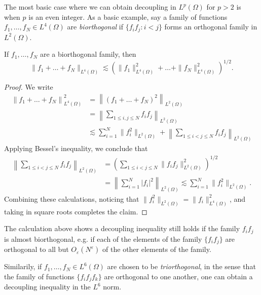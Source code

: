 The most basic case where we can obtain decoupling in $L^p(\Omega)$ for $p > 2$ is when $p$ is an even integer. As a basic example, say a family of functions $f_1, \dots, f_N \in L^4(\Omega)$ are \emph{biorthogonal} if $\{ f_i f_j : i < j \}$ forms an orthogonal family in $L^2(\Omega)$.

\begin{theorem}
  If $f_1, \dots, f_N$ are a biorthogonal family, then
  \[ \| f_1 + \dots + f_N \|_{L^4(\Omega)} \lesssim \left( \| f_1 \|_{L^4(\Omega)}^2 + \dots + \| f_N \|_{L^4(\Omega)}^2 \right)^{1/2}. \]
\end{theorem}
\begin{proof}
  We write
  \begin{align*}
    \left\| f_1 + \dots + f_N \right\|_{L^4(\Omega)}^2 &= \left\| (f_1 + \dots + f_N)^2 \right\|_{L^2(\Omega)}\\
    &= \left\| \sum_{1 \leq i,j \leq N} f_i f_j \right\|_{L^2(\Omega)}\\
    &\lesssim \sum_{i = 1}^N \| f_i^2 \|_{L^2(\Omega)} + \left\| \sum_{1 \leq i < j \leq N} f_i f_j \right\|_{L^2(\Omega)}
  \end{align*}
  Applying Bessel's inequality, we conclude that
  \begin{align*}
    \left\| \sum_{1 \leq i < j \leq N} f_i f_j \right\|_{L^2(\Omega)} &= \left( \sum_{1 \leq i < j \leq N} \| f_i f_j \|_{L^2(\Omega)}^2 \right)^{1/2}\\
    &= \left\| \sum_{i = 1}^N |f_i|^2 \right\|_{L^2(\Omega)} \lesssim \sum_{i = 1}^N \| f_i^2 \|_{L^2(\Omega)}.
  \end{align*}
  Combining these calculations, noticing that $\| f_i^2 \|_{L^2(\Omega)} = \| f_i \|_{L^4(\Omega)}^2$, and taking in square roots completes the claim.
\end{proof}

\begin{remark}
  The calculation above shows a decoupling inequality still holds if the family $f_i f_j$ is almost biorthogonal, e.g. if each of the elements of the family $\{ f_i f_j \}$ are orthogonal to all but $O_\varepsilon(N^\varepsilon)$ of the other elements of the family.
\end{remark}

\begin{remark}
  Similarily, if $f_1, \dots, f_N \in L^6(\Omega)$ are chosen to be \emph{triorthogonal}, in the sense that the family of functions $\{ f_i f_j f_k \}$ are orthogonal to one another, one can obtain a decoupling inequality in the $L^6$ norm.
\end{remark}

